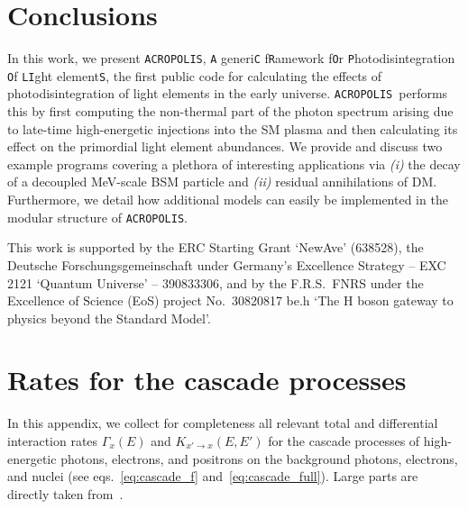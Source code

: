 \documentclass[11pt,a4paper]{article}
\newcommand{\X}{x}
\newcommand{\acropolis}{\texttt{ACROPOLIS}~}
\begin{document}
\section{Conclusions}

In this work, we present \texttt{ACROPOLIS}, \texttt{A} generi\texttt{C} f\texttt{R}amework f\texttt{O}r \texttt{P}hotodisintegration \texttt{O}f \texttt{LI}ght element\texttt{S}, the first public code for calculating the effects of photodisintegration of light elements in the early universe. \acropolis performs this by first computing the non-thermal part of the photon spectrum arising due to late-time high-energetic injections into the SM plasma and then calculating its effect on the primordial light element abundances. We provide and discuss two example programs covering a plethora of interesting applications via {\it (i)} the decay of a decoupled MeV-scale BSM particle and {\it (ii)} residual annihilations of DM. Furthermore, we detail how additional models can easily be implemented in the modular structure of \texttt{ACROPOLIS}.

\acknowledgments

This work is supported by the ERC Starting Grant `NewAve' (638528), the
Deutsche Forschungsgemeinschaft under Germany's Excellence Strategy -- EXC 2121 `Quantum Universe' -- 390833306,
and by the F.R.S.\ FNRS under the Excellence of Science (EoS) project No.\ 30820817 be.h `The H boson gateway to physics beyond the Standard Model'.

\appendix

\section{Rates for the cascade processes}
\label{app:rates_cascade}
\newcommand{\be}{\bar{\epsilon}}
\newcommand{\Ep}{E' + \be - E}

In this appendix, we collect for completeness all relevant total and differential interaction rates $\Gamma_\X(E)$ and $K_{\X' \to \X}(E,E')$ for the cascade processes of high-energetic photons, electrons, and positrons on the background photons, electrons, and nuclei (see eqs.~\eqref{eq:cascade_f} and~\eqref{eq:cascade_full}). Large parts are directly taken from~\cite{Hufnagel:2018bjp}.
\end{document}

